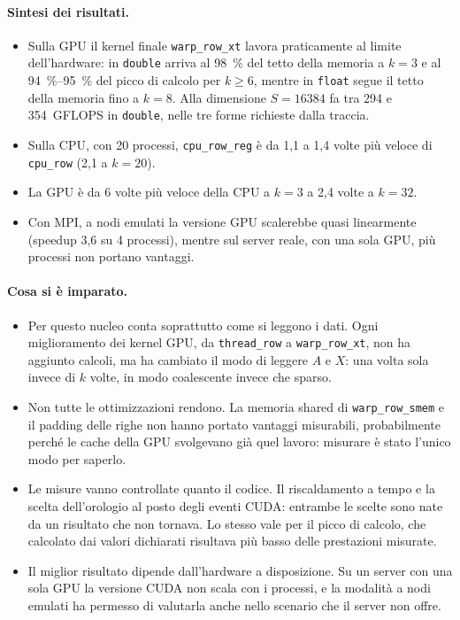 \documentclass[11pt,a4paper]{article}
\begin{document}
\paragraph{Sintesi dei risultati.}
\begin{itemize}
  \item Sulla GPU il kernel finale \texttt{warp\_row\_xt} lavora praticamente al
        limite dell'hardware: in \texttt{double} arriva al \SI{98}{\percent} del
        tetto della memoria a $k = 3$ e al \SIrange{94}{95}{\percent} del picco
        di calcolo per $k \ge 6$, mentre in \texttt{float} segue il tetto della memoria fino a $k = 8$. Alla dimensione $S = 16384$ fa tra 294 e
        354~GFLOPS in \texttt{double}, nelle tre forme richieste dalla traccia.
  \item Sulla CPU, con 20 processi, \texttt{cpu\_row\_reg} è da 1,1 a 1,4 volte
        più veloce di \texttt{cpu\_row} (2,1 a $k = 20$).
  \item La GPU è da 6 volte più veloce della CPU a $k = 3$ a 2,4 volte a
        $k = 32$.
  \item Con MPI, a nodi emulati la
        versione GPU scalerebbe quasi linearmente (speedup 3,6 su 4 processi),
        mentre sul server reale, con una sola GPU, più processi non portano
        vantaggi.
\end{itemize}

\paragraph{Cosa si è imparato.}
\begin{itemize}
  \item Per questo nucleo conta soprattutto come si leggono i dati. Ogni
        miglioramento dei kernel GPU, da \texttt{thread\_row} a
        \texttt{warp\_row\_xt}, non ha aggiunto calcoli, ma ha cambiato il modo
        di leggere $A$ e $X$: una volta sola invece di $k$ volte, in modo
        coalescente invece che sparso.
  \item Non tutte le ottimizzazioni rendono. La memoria shared di
        \texttt{warp\_row\_smem} e il padding delle righe non hanno portato
        vantaggi misurabili, probabilmente perché le cache della GPU svolgevano già quel
        lavoro: misurare è stato l'unico modo per saperlo.
  \item Le misure vanno controllate quanto il codice. Il riscaldamento a tempo e
        la scelta dell'orologio al posto degli eventi CUDA: entrambe le scelte
        sono nate da un risultato che non tornava. Lo stesso vale per il picco di calcolo, che
        calcolato dai valori dichiarati risultava più basso delle prestazioni
        misurate.
  \item Il miglior risultato dipende dall'hardware a disposizione. Su un server
        con una sola GPU la versione CUDA non scala con i processi, e la
        modalità a nodi emulati ha permesso di valutarla anche nello scenario
        che il server non offre.
\end{itemize}
\end{document}
